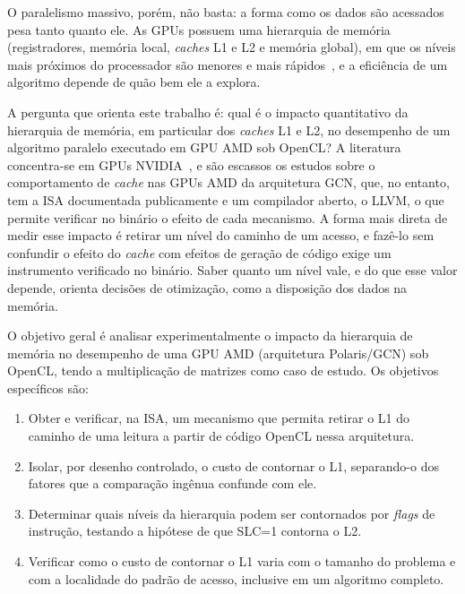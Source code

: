 \documentclass[12pt]{article}
\begin{document}
O paralelismo massivo, porém, não basta: a forma como os dados são acessados pesa tanto quanto ele. As GPUs possuem uma hierarquia de memória (registradores, memória local, \textit{caches} L1 e L2 e memória global), em que os níveis mais próximos do processador são menores e mais rápidos~\cite{amdgcn3, rocmspecs}, e a eficiência de um algoritmo depende de quão bem ele a explora.

A pergunta que orienta este trabalho é: qual é o impacto quantitativo da hierarquia de memória, em particular dos \textit{caches} L1 e L2, no desempenho de um algoritmo paralelo executado em GPU AMD sob OpenCL? A literatura concentra-se em GPUs NVIDIA~\cite{wong2010, jia2012, baghsorkhi2012, mei2017, jia2018}, e são escassos os estudos sobre o comportamento de \textit{cache} nas GPUs AMD da arquitetura GCN, que, no entanto, tem a ISA documentada publicamente e um compilador aberto, o LLVM, o que permite verificar no binário o efeito de cada mecanismo. A forma mais direta de medir esse impacto é retirar um nível do caminho de um acesso, e fazê-lo sem confundir o efeito do \textit{cache} com efeitos de geração de código exige um instrumento verificado no binário. Saber quanto um nível vale, e do que esse valor depende, orienta decisões de otimização, como a disposição dos dados na memória.

O objetivo geral é analisar experimentalmente o impacto da hierarquia de memória no desempenho de uma GPU AMD (arquitetura Polaris/GCN) sob OpenCL, tendo a multiplicação de matrizes como caso de estudo. Os objetivos específicos são:

\begin{enumerate}\setlength{\itemsep}{0pt}\setlength{\parsep}{0pt}
\item Obter e verificar, na ISA, um mecanismo que permita retirar o L1 do caminho de uma leitura a partir de código OpenCL nessa arquitetura.
\item Isolar, por desenho controlado, o custo de contornar o L1, separando-o dos fatores que a comparação ingênua confunde com ele.
\item Determinar quais níveis da hierarquia podem ser contornados por \textit{flags} de instrução, testando a hipótese de que SLC=1 contorna o L2.
\item Verificar como o custo de contornar o L1 varia com o tamanho do problema e com a localidade do padrão de acesso, inclusive em um algoritmo completo.
\end{enumerate}
\end{document}

